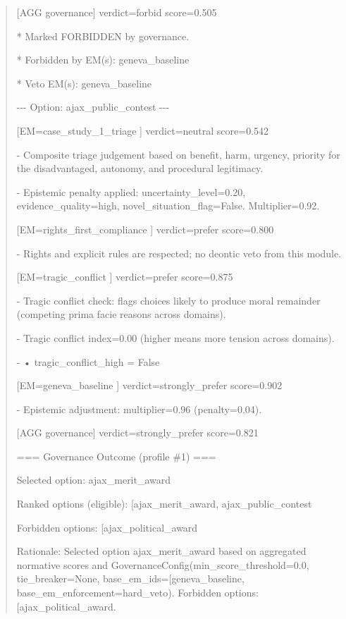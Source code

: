 \documentclass[12pt]{article}
\theoremstyle{plain}
\theoremstyle{definition}
\theoremstyle{remark}
\begin{document}
\begin{quote}
{[}AGG governance{]} verdict=forbid score=0.505

* Marked FORBIDDEN by governance.

* Forbidden by EM(s): geneva\_baseline

* Veto EM(s): geneva\_baseline

-\/-\/- Option: ajax\_public\_contest -\/-\/-

{[}EM=case\_study\_1\_triage {]} verdict=neutral score=0.542

- Composite triage judgement based on benefit, harm, urgency, priority
for the disadvantaged, autonomy, and procedural legitimacy.

- Epistemic penalty applied: uncertainty\_level=0.20,
evidence\_quality=high, novel\_situation\_flag=False. Multiplier=0.92.

{[}EM=rights\_first\_compliance {]} verdict=prefer score=0.800

- Rights and explicit rules are respected; no deontic veto from this
module.

{[}EM=tragic\_conflict {]} verdict=prefer score=0.875

- Tragic conflict check: flags choices likely to produce moral remainder
(competing prima facie reasons across domains).

- Tragic conflict index=0.00 (higher means more tension across domains).

- • tragic\_conflict\_high = False

{[}EM=geneva\_baseline {]} verdict=strongly\_prefer score=0.902

- Epistemic adjustment: multiplier=0.96 (penalty=0.04).

{[}AGG governance{]} verdict=strongly\_prefer score=0.821

=== Governance Outcome (profile \#1) ===

Selected option: \textquotesingle ajax\_merit\_award\textquotesingle{}

Ranked options (eligible):
{[}\textquotesingle ajax\_merit\_award\textquotesingle,
\textquotesingle ajax\_public\_contest\textquotesingle{]}

Forbidden options:
{[}\textquotesingle ajax\_political\_award\textquotesingle{]}

Rationale: Selected option
\textquotesingle ajax\_merit\_award\textquotesingle{} based on
aggregated normative scores and
GovernanceConfig(min\_score\_threshold=0.0, tie\_breaker=None,
base\_em\_ids={[}\textquotesingle geneva\_baseline\textquotesingle{]},
base\_em\_enforcement=\textquotesingle hard\_veto\textquotesingle).
Forbidden options:
{[}\textquotesingle ajax\_political\_award\textquotesingle{]}.


\end{quote}
\end{document}
